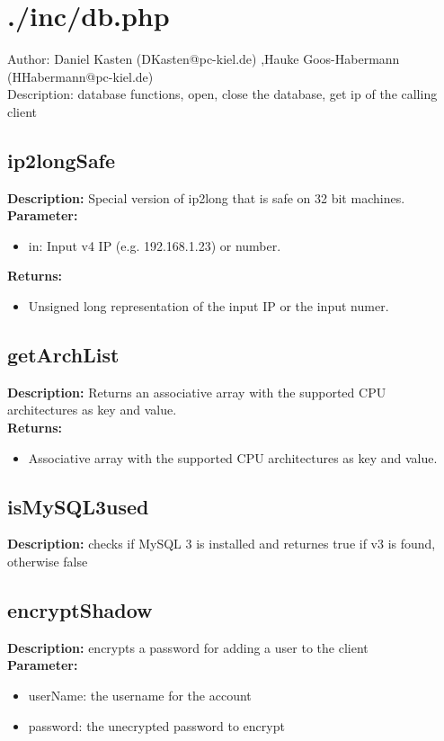 \newpage\section{./inc/db.php}
 Author: Daniel Kasten (DKasten@pc-kiel.de) ,Hauke Goos-Habermann (HHabermann@pc-kiel.de)\\
 Description: database functions, open, close the database, get ip of the calling client\\

\subsection{ip2longSafe}
\textbf{Description:} Special version of ip2long that is safe on 32 bit machines.\\
\textbf{Parameter:}
\begin{itemize}
\item in: Input v4 IP (e.g. 192.168.1.23) or number.
\end{itemize}
\textbf{Returns:}
\begin{itemize}
\item Unsigned long representation of the input IP or the input numer.
\end{itemize}

\subsection{getArchList}
\textbf{Description:} Returns an associative array with the supported CPU architectures as key and value.\\
\textbf{Returns:}
\begin{itemize}
\item Associative array with the supported CPU architectures as key and value.
\end{itemize}

\subsection{isMySQL3used}
\textbf{Description:} checks if MySQL 3 is installed and returnes true if v3 is found, otherwise false\\

\subsection{encryptShadow}
\textbf{Description:} encrypts a password for adding a user to the client\\
\textbf{Parameter:}
\begin{itemize}
\item userName: the username for the account
\item password: the unecrypted password to encrypt
\end{itemize}

